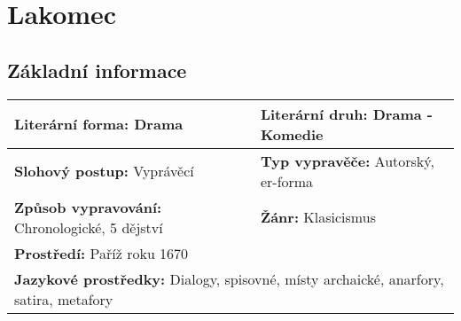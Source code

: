 \section{Lakomec}
\subsection*{Základní informace}
\begin{tabularx}{\linewidth}{l|l}
    \textbf{Literární forma:} Drama                       & \textbf{Literární druh:} Drama - Komedie                 \\
    \hline
    \textbf{Slohový postup:} Vyprávěcí                    & \textbf{Typ vypravěče:} Autorský, er-forma               \\
    \hline
    \textbf{Způsob vypravování:} Chronologické, 5 dějství & \textbf{Žánr:} Klasicismus                               \\
    \hline
    \multicolumn{2}{l}{\textbf{Prostředí:} Paříž roku 1670}                                                          \\
    \hline
    \multicolumn{2}{l}{\textbf{Jazykové prostředky:} Dialogy, spisovné, místy archaické, anarfory, satira, metafory} \\
\end{tabularx}
